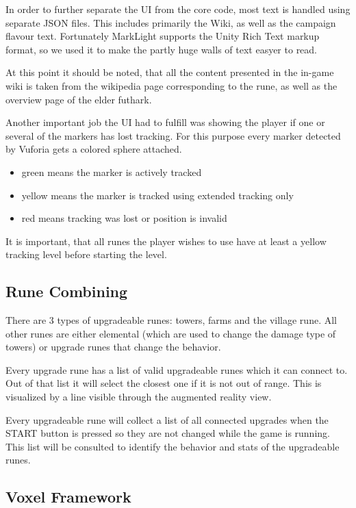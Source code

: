In order to further separate the UI from the core code, most text is handled using separate JSON files. This includes primarily the Wiki, as well as the campaign flavour text. Fortunately MarkLight supports the Unity Rich Text markup format, so we used it to make the partly huge walls of text easyer to read.\cite{unity-rich-text}

At this point it should be noted, that all the content presented in the in-game wiki is taken from the wikipedia page corresponding to the rune, as well as the overview page of the elder futhark.\cite{elder-futhark}

Another important job the UI had to fulfill was showing the player if one or several of the markers has lost tracking. For this purpose every marker detected by Vuforia gets a colored sphere attached.
\begin{itemize}
	\item green means the marker is actively tracked
	\item yellow means the marker is tracked using extended tracking only
	\item red means tracking was lost or position is invalid
\end{itemize}

It is important, that all runes the player wishes to use have at least a yellow tracking level before starting the level.

\subsection{Rune Combining}
There are 3 types of upgradeable runes: towers, farms and the village rune. All other runes are either elemental (which are used to change the damage type of towers) or upgrade runes that change the behavior.

Every upgrade rune has a list of valid upgradeable runes which it can connect to. Out of that list it will select the closest one if it is not out of range. This is visualized by a line visible through the augmented reality view.

Every upgradeable rune will collect a list of all connected upgrades when the START button is pressed so they are not changed while the game is running. This list will be consulted to identify the behavior and stats of the upgradeable runes.


\subsection{Voxel Framework}
\label{sec:implementation:voxelframework}

